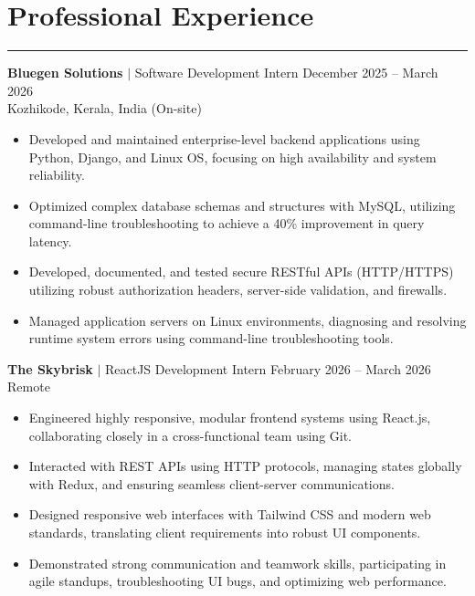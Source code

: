 \documentclass[letterpaper,10pt]{article}
\begin{document}
\section*{Professional Experience}
\hrule
\vspace{4pt}

\textbf{Bluegen Solutions} $|$ Software Development Intern \hfill December 2025 -- March 2026 \\
Kozhikode, Kerala, India (On-site)
\begin{itemize}
\item Developed and maintained enterprise-level backend applications using Python, Django, and Linux OS, focusing on high availability and system reliability.
\item Optimized complex database schemas and structures with MySQL, utilizing command-line troubleshooting to achieve a 40\% improvement in query latency.
\item Developed, documented, and tested secure RESTful APIs (HTTP/HTTPS) utilizing robust authorization headers, server-side validation, and firewalls.
\item Managed application servers on Linux environments, diagnosing and resolving runtime system errors using command-line troubleshooting tools.
\end{itemize}

\vspace{4pt}

\textbf{The Skybrisk} $|$ ReactJS Development Intern \hfill February 2026 -- March 2026 \\
Remote
\begin{itemize}
\item Engineered highly responsive, modular frontend systems using React.js, collaborating closely in a cross-functional team using Git.
\item Interacted with REST APIs using HTTP protocols, managing states globally with Redux, and ensuring seamless client-server communications.
\item Designed responsive web interfaces with Tailwind CSS and modern web standards, translating client requirements into robust UI components.
\item Demonstrated strong communication and teamwork skills, participating in agile standups, troubleshooting UI bugs, and optimizing web performance.
\end{itemize}

\vspace{4pt}
\end{document}
